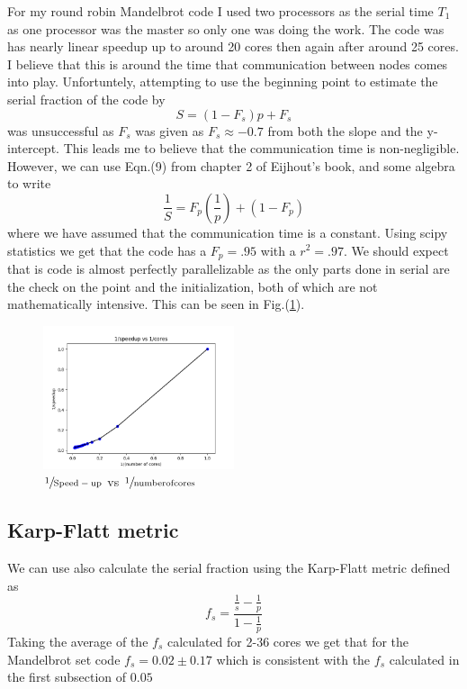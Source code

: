\documentclass[12pt]{article}
\theoremstyle{plain}
\theoremstyle{definition}
\begin{document}
For my round robin Mandelbrot code I used two processors as the serial time $T_1$ as one processor was the master so only one was doing the work. The code was has nearly linear speedup up to around 20 cores then again after around 25 cores. I believe that this is around the time that communication between nodes comes into play. Unfortuntely, attempting to use the beginning point to estimate the serial fraction of the code by 
\begin{equation}
S = (1-F_s)p + F_s
\end{equation} 
was unsuccessful as $F_s$ was given as $F_s \approx -0.7$ from both the slope and the y-intercept. This leads me to believe that the communication time is non-negligible. However, we can use Eqn.(9) from chapter 2 of Eijhout's book, and some algebra to write
\begin{equation}
\frac{1}{S} = F_p (\frac{1}{p}) + (1-F_p)
\end{equation}  
where we have assumed that the communication time is a constant. Using scipy statistics we get that the code has a $F_p = .95$ with a $r^2 = .97$. We should expect that is code is almost perfectly parallelizable as the only parts done in serial are the check on the point and the initialization, both of which are not mathematically intensive. This can be seen in Fig.(\ref{fig:inverse1a}).
\begin{figure}
        \includegraphics[width=0.5\textwidth]{inverseq1_strong.png}
        \caption{$\sfrac{1}{\mathrm{Speed-up}}$ vs $\sfrac{1}{\mathrm{number of cores}}$}
        \label{fig:inverse1a}
\end{figure}

 
\subsection{Karp-Flatt metric}
We can use also calculate the serial fraction using the Karp-Flatt metric defined as 
\begin{equation}
f_s = \frac{\frac{1}{s}-\frac{1}{p}}{1-\frac{1}{p}}
\end{equation}
Taking the average of the $f_s$ calculated for 2-36 cores we get that for the Mandelbrot set code $f_s = 0.02 \pm 0.17$ which is consistent with the $f_s$ calculated in the first subsection of $0.05$
\end{document}
